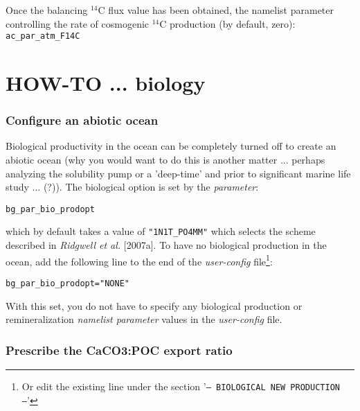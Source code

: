 \documentclass[11pt,fleqn]{book} %
\begin{document}
Once the balancing \(^{14}\)C flux value has been obtained,  the namelist parameter controlling the rate of cosmogenic \(^{14}\)C production (by default, zero): \texttt{ac\_par\_atm\_F14C}


\newpage


\section{HOW-TO ...  biology}

%
\subsubsection{Configure an abiotic ocean}
\vspace{1mm}

Biological productivity in the ocean can be completely turned off to create an abiotic ocean (why you would want to do this is another matter ... perhaps analyzing the solubility pump or a 'deep-time' and prior to significant marine life study ... (?)). The biological option is set by the \textit{parameter}:
\vspace{-5mm}\small\begin{verbatim}
bg_par_bio_prodopt
\end{verbatim}\vspace{-1mm}\normalsize
 which by default takes a value of \texttt{"1N1T\_PO4MM"} which selects the scheme described in \textit{Ridgwell et al.} [2007a]. To have no biological production in the ocean, add the following line to the end of the \textit{user-config} file\footnote{Or edit the existing line under the section '\texttt{--- BIOLOGICAL NEW PRODUCTION ---}'}:
\vspace{-2mm}\small\begin{verbatim}
bg_par_bio_prodopt="NONE"
\end{verbatim}\normalsize\vspace{-2mm}
With this set, you do not have to specify any biological production or remineralization \textit{namelist parameter} values in the \textit{user-config} file.

%
\subsubsection{Prescribe the CaCO3:POC export ratio}
\vspace{1mm}
\end{document}
